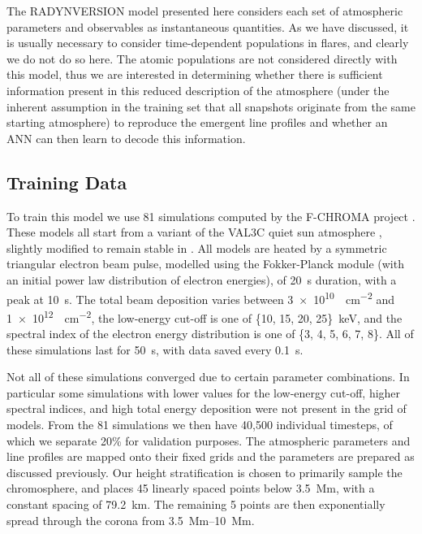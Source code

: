 The RADYNVERSION model presented here considers each set of atmospheric parameters and observables as instantaneous quantities.
As we have discussed, it is usually necessary to consider time-dependent populations in flares, and clearly we do not do so here.
The atomic populations are not considered directly with this model, thus we are interested in determining whether there is sufficient information present in this reduced description of the atmosphere (under the inherent assumption in the training set that all snapshots originate from the same starting atmosphere) to reproduce the emergent line profiles and whether an ANN can then learn to decode this information.

\subsection{Training Data}

To train this model we use 81 \Radyn{} simulations computed by the F-CHROMA project \NeedRef{} .
These models all start from a variant of the VAL3C quiet sun atmosphere \citep{Vernazza1981}, slightly modified to remain stable in \Radyn{}.
All models are heated by a symmetric triangular electron beam pulse, modelled using the Fokker-Planck module (with an initial power law distribution of electron energies), of \SI{20}{\s} duration, with a peak at \SI{10}{\s}.
The total beam deposition varies between \SI{3e10}{\erg\per\square\cm} and \SI{1e12}{\erg\per\square\cm}, the low-energy cut-off is one of \{10, 15, 20, 25\}~\si{\kilo\electronvolt}, and the spectral index of the electron energy distribution is one of \{3, 4, 5, 6, 7, 8\}.
All of these simulations last for \SI{50}{\s}, with data saved every \SI{0.1}{\s}.

Not all of these simulations converged due to certain parameter combinations.
In particular some simulations with lower values for the low-energy cut-off, higher spectral indices, and high total energy deposition were not present in the grid of models.
From the 81 simulations we then have 40,500 individual timesteps, of which we separate 20\% for validation purposes.
The atmospheric parameters and line profiles are mapped onto their fixed grids and the parameters are prepared as discussed previously.
Our height stratification is chosen to primarily sample the chromosphere, and places 45 linearly spaced points below \SI{3.5}{\mega\metre}, with a constant spacing of \SI{79.2}{\kilo\metre}.
The remaining 5 points are then exponentially spread through the corona from \SIrange{3.5}{10}{\mega\metre}.

